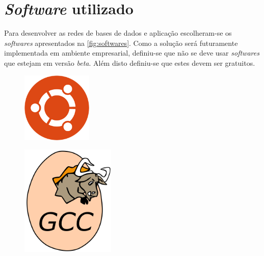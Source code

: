 \documentclass[11pt,twoside,a4paper]{report}
\begin{document}

\newpage
\section{\textit{Software} utilizado}
Para desenvolver as redes de bases de dados e aplicação escolheram-se os \textit{softwares} apresentados na \autoref{fig:softwares}. Como a solução será futuramente implementada em ambiente empresarial, definiu-se que não se deve usar \textit{softwares} que estejam em versão \textit{beta}. Além disto definiu-se que estes devem ser gratuitos.
\begin{figure}[H]
	\centering
	\begin{minipage}{0.33\textwidth}
		\vspace{0.88cm}
		\begin{center}
			\includegraphics[width=0.3\textwidth]{ubuntu} %
			\label{fig:linux}
		\end{center}
	\end{minipage}%
	\begin{minipage}{0.33\textwidth}
		\begin{center}
			\includegraphics[width=0.4\textwidth]{gcc} %

\end{center}
\end{minipage}
\end{figure}
\end{document}
